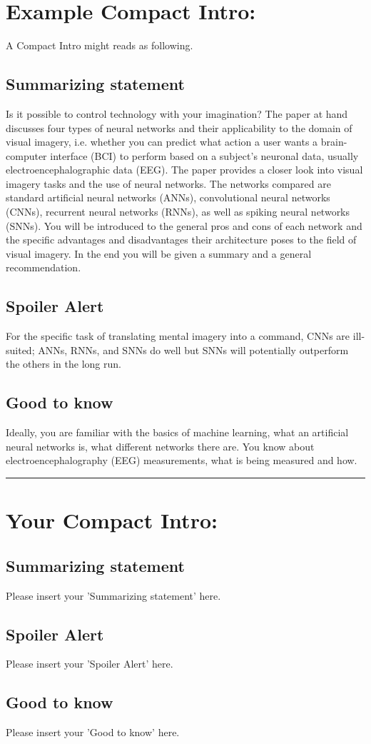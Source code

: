 \section*{Example Compact Intro:}
A Compact Intro might reads as following. 
\subsection*{Summarizing statement}
Is it possible to control technology with your imagination?
The paper at hand discusses four types of neural networks and their applicability to the domain of visual imagery, i.e. whether you can predict what action a user wants a brain-computer interface (BCI) to perform based on a subject’s neuronal data, usually electroencephalographic data (EEG). The paper provides a closer look into visual imagery tasks and the use of neural networks. The networks compared are standard artificial neural networks (ANNs), convolutional neural networks (CNNs), recurrent neural networks (RNNs), as well as spiking neural networks (SNNs). You will be introduced to the general pros and cons of each network and the specific advantages and disadvantages their architecture poses to the field of visual imagery. In the end you will be given a summary and a general recommendation.

\subsection*{Spoiler Alert} 
For the specific task of translating mental imagery into a command, CNNs are ill-suited; ANNs, RNNs, and SNNs do well but SNNs will potentially outperform the others in the long run.

\subsection*{Good to know}
Ideally, you are familiar with the basics of machine learning, what an artificial neural networks is, what different networks there are.
You know about electroencephalography (EEG) measurements, what is being measured and how.


\par\noindent\textcolor{cssj_purple}{\rule{\textwidth}{0.2pt}}

\section*{Your Compact Intro:}
\subsection*{Summarizing statement}
\textcolor{cssj_purple}{Please insert your 'Summarizing statement' here.}
\subsection*{Spoiler Alert} 
\textcolor{cssj_purple}{Please insert your 'Spoiler Alert' here.}
\subsection*{Good to know}
\textcolor{cssj_purple}{Please insert your 'Good to know' here.}